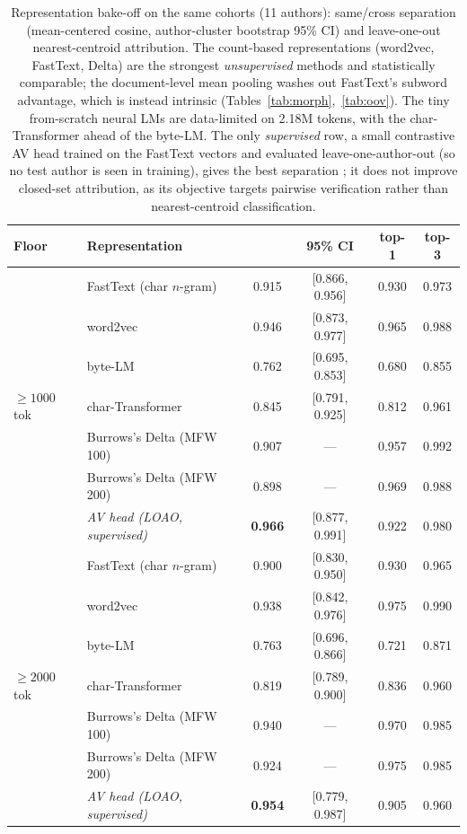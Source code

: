 \begin{table}[t]
  \centering
  \begin{tabular}{llcccc}
    \toprule
    \textbf{Floor} & \textbf{Representation} & \textbf{\auc{}} & \textbf{95\% CI}
    & \textbf{top-1} & \textbf{top-3} \\
    \midrule
    \multirow{7}{*}{$\geq 1000$ tok}
      & FastText (char $n$-gram) & 0.915 & [0.866, 0.956] & 0.930 & 0.973 \\
      & word2vec                 & 0.946 & [0.873, 0.977] & 0.965 & 0.988 \\
      & byte-LM                  & 0.762 & [0.695, 0.853] & 0.680 & 0.855 \\
      & char-Transformer         & 0.845 & [0.791, 0.925] & 0.812 & 0.961 \\
      & Burrows's Delta (MFW 100) & 0.907 & ---           & 0.957 & 0.992 \\
      & Burrows's Delta (MFW 200) & 0.898 & ---           & 0.969 & 0.988 \\
      & \textit{AV head (LOAO, supervised)} & \textbf{0.966} & [0.877, 0.991] & 0.922 & 0.980 \\
    \midrule
    \multirow{7}{*}{$\geq 2000$ tok}
      & FastText (char $n$-gram) & 0.900 & [0.830, 0.950] & 0.930 & 0.965 \\
      & word2vec                 & 0.938 & [0.842, 0.976] & 0.975 & 0.990 \\
      & byte-LM                  & 0.763 & [0.696, 0.866] & 0.721 & 0.871 \\
      & char-Transformer         & 0.819 & [0.789, 0.900] & 0.836 & 0.960 \\
      & Burrows's Delta (MFW 100) & 0.940 & ---           & 0.970 & 0.985 \\
      & Burrows's Delta (MFW 200) & 0.924 & ---           & 0.975 & 0.985 \\
      & \textit{AV head (LOAO, supervised)} & \textbf{0.954} & [0.779, 0.987] & 0.905 & 0.960 \\
    \bottomrule
  \end{tabular}
  \caption{Representation bake-off on the same cohorts (11 authors): same/cross
  separation \auc{} (mean-centered cosine, author-cluster bootstrap 95\% CI) and
  leave-one-out nearest-centroid attribution. The count-based representations
  (word2vec, FastText, Delta) are the strongest \emph{unsupervised} methods and
  statistically comparable; the document-level mean pooling washes out FastText's
  subword advantage, which is instead intrinsic
  (Tables~\ref{tab:morph},~\ref{tab:oov}). The tiny from-scratch neural LMs are
  data-limited on 2.18M tokens, with the char-Transformer ahead of the byte-LM.
  The only \emph{supervised} row, a small contrastive AV head trained on the
  FastText vectors and evaluated leave-one-author-out (so no test author is seen
  in training), gives the best separation \auc{}; it does not improve closed-set
  attribution, as its objective targets pairwise verification rather than
  nearest-centroid classification.}
  \label{tab:bakeoff}
\end{table}

